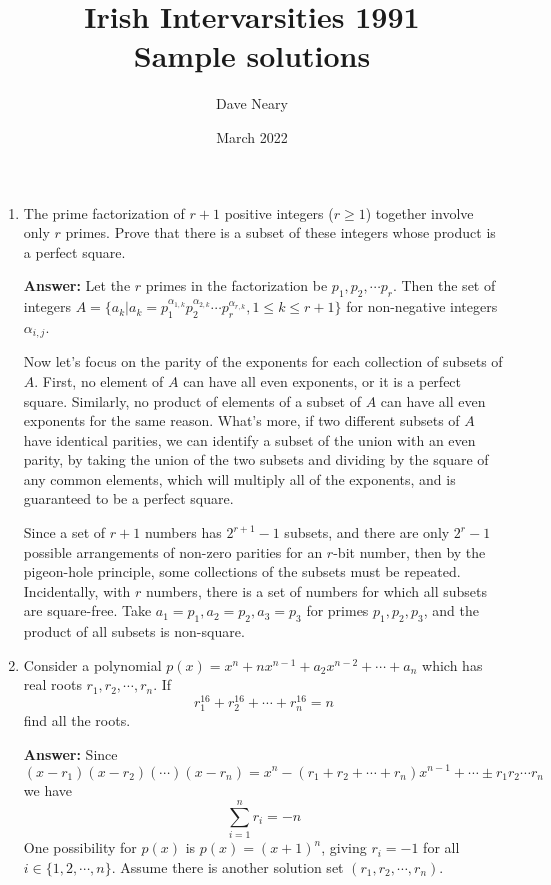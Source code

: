\documentclass{article}
\title{Irish Intervarsities 1991 \\ Sample solutions}
\author{Dave Neary}
\date{March 2022}
\begin{document}
\maketitle

\begin{enumerate}
    \item The prime factorization of $r+1$ positive integers ($r \geq 1$) together involve only $r$ primes. Prove that there is a subset of these integers whose product is a perfect square.
    
    \textbf{Answer:} Let the $r$ primes in the factorization be $p_1, p_2, \cdots p_r$. Then the set of integers $A = \{a_k | a_k = p_1^{\alpha_{1,k}}p_2^{\alpha_{2,k}}\cdots p_r^{\alpha_{r,k}}, 1\leq k \leq r+1\}$ for non-negative integers $\alpha_{i,j}$.
    
    Now let's focus on the parity of the exponents for each collection of subsets of $A$. First, no element of $A$ can have all even exponents, or it is a perfect square. Similarly, no product of elements of a subset of $A$ can have all even exponents for the same reason. What's more, if two different subsets of $A$ have identical parities, we can identify a subset of the union with an even parity, by taking the union of the two subsets and dividing by the square of any common elements, which will multiply all of the exponents, and is guaranteed to be a perfect square.
    
    Since a set of $r+1$ numbers has $2^{r+1}-1$ subsets, and there are only $2^r-1$ possible arrangements of non-zero parities for an $r$-bit number, then by the pigeon-hole principle, some collections of the subsets must be repeated. Incidentally, with $r$ numbers, there is a set of numbers for which all subsets are square-free. Take $a_1=p_1, a_2=p_2, a_3=p_3$ for primes $p_1, p_2, p_3$, and the product of all  subsets is non-square.
    
    \item Consider a polynomial $p(x) = x^n + nx^{n-1} + a_2x^{n-2} + \cdots + a_n$ which has real roots $r_1, r_2, \cdots, r_n$. If
    \[ r_1^{16} + r_2^{16} + \cdots + r_n^{16} = n \]
    find all the roots.
    
    \textbf{Answer:} Since
    \[ (x-r_1)(x-r_2)(\cdots)(x-r_n) = x^n-(r_1+r_2+\cdots+r_n)x^{n-1} + \cdots \pm r_1r_2\cdots r_n \]
    we have 
    \[\sum_{i=1}^{n} r_i = -n\]
    One possibility for $p(x)$ is $p(x) = (x+1)^{n}$, giving $r_i = -1$ for all $i \in \{1, 2, \cdots, n\}$. Assume there is another solution set $(r_1, r_2, \cdots, r_n)$.


\end{enumerate}
\end{document}
